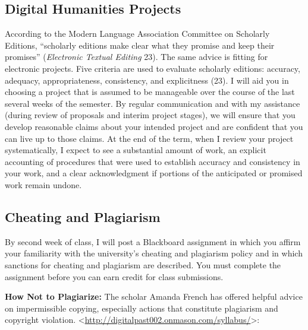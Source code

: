 \documentclass[]{article}
\begin{document}
\subsection{Digital Humanities
Projects}\label{digital-humanities-projects}

According to the Modern Language Association Committee on Scholarly
Editions, ``scholarly editions make clear what they promise and keep
their promises'' (\emph{Electronic Textual Editing} 23). The same advice
is fitting for electronic projects. Five criteria are used to evaluate
scholarly editions: accuracy, adequacy, appropriateness, consistency,
and explicitness (23). I will aid you in choosing a project that is
assumed to be manageable over the course of the last several weeks of
the semester. By regular communication and with my assistance (during
review of proposals and interim project stages), we will ensure that you
develop reasonable claims about your intended project and are confident
that you can live up to those claims. At the end of the term, when I
review your project systematically, I expect to see a substantial amount
of work, an explicit accounting of procedures that were used to
establish accuracy and consistency in your work, and a clear
acknowledgment if portions of the anticipated or promised work remain
undone.

\subsection{Cheating and Plagiarism}\label{cheating-and-plagiarism}

By second week of class, I will post a Blackboard assignment in which
you affirm your familiarity with the university's cheating and
plagiarism policy and in which sanctions for cheating and plagiarism are
described. You must complete the assignment before you can earn credit
for class submissions.

\textbf{How Not to Plagiarize: } The scholar Amanda French has offered
helpful advice on impermissible copying, especially actions that
constitute plagiarism and copyright violation.
\textless{}\url{http://digitalpast002.onmason.com/syllabus/}\textgreater{}:
\end{document}
